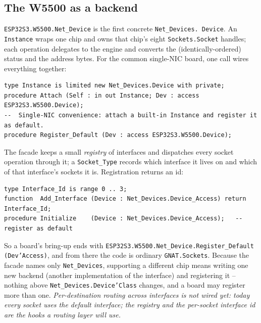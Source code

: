 \subsection{The W5500 as a backend}

\texttt{ESP32S3.W5500.Net\_Device} is the first concrete \texttt{Net\_Devices.%
Device}. An \texttt{Instance} wraps one chip and owns that chip's eight
\texttt{Sockets.Socket} handles; each operation delegates to the engine and
converts the (identically-ordered) status and the address bytes. For the common
single-NIC board, one call wires everything together:

\begin{lstlisting}
type Instance is limited new Net_Devices.Device with private;
procedure Attach (Self : in out Instance; Dev : access ESP32S3.W5500.Device);
--  Single-NIC convenience: attach a built-in Instance and register it as default.
procedure Register_Default (Dev : access ESP32S3.W5500.Device);
\end{lstlisting}

The facade keeps a small \emph{registry} of interfaces and dispatches every socket
operation through it; a \texttt{Socket\_Type} records which interface it lives on
and which of that interface's sockets it is. Registration returns an id:

\begin{lstlisting}
type Interface_Id is range 0 .. 3;
function  Add_Interface (Device : Net_Devices.Device_Access) return Interface_Id;
procedure Initialize    (Device : Net_Devices.Device_Access);   --  register as default
\end{lstlisting}

So a board's bring-up ends with \texttt{ESP32S3.W5500.Net\_Device.Register\_Default
(Dev'Access)}, and from there the code is ordinary \texttt{GNAT.Sockets}. Because
the facade names only \texttt{Net\_Devices}, supporting a different chip means
writing one new backend (another implementation of the interface) and registering
it -- nothing above \texttt{Net\_Devices.Device'Class} changes, and a board may
register more than one. \emph{Per-destination routing across interfaces is not
wired yet: today every socket uses the default interface; the registry and the
per-socket interface id are the hooks a routing layer will use.}


